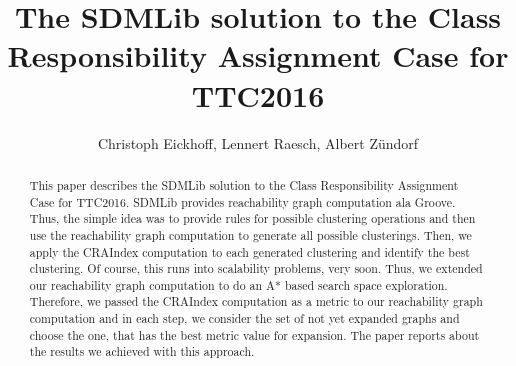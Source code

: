 \documentclass[a4paper]{article}
\begin{document}






\title{The SDMLib solution to the Class Responsibility Assignment Case for TTC2016} 
\author{Christoph Eickhoff, Lennert Raesch, Albert Z{\"u}ndorf\\
}

\def\authorrunning{ Albert Z{\"u}ndorf}
\def\titlerunning{The SDMLib solution for TTC2016}

\maketitle

\begin{abstract}

This paper describes the SDMLib solution to the Class Responsibility Assignment Case 
for TTC2016. SDMLib provides reachability graph computation ala Groove. Thus, 
the simple idea was to provide rules for possible clustering operations and then use the
reachability graph computation to generate all possible clusterings. Then, we apply the
CRAIndex computation to each generated clustering and identify the best clustering. Of course,
this runs into scalability problems, very soon. Thus, we extended our reachability graph 
computation to do an A* based search space exploration. Therefore, we passed the CRAIndex 
computation as a metric to our reachability graph computation and in each step, we consider 
the set of not yet expanded graphs and choose the one, that has the best metric value for 
expansion. The paper reports about the results we achieved with this approach.  
   
  
\end{abstract}
\end{document}
